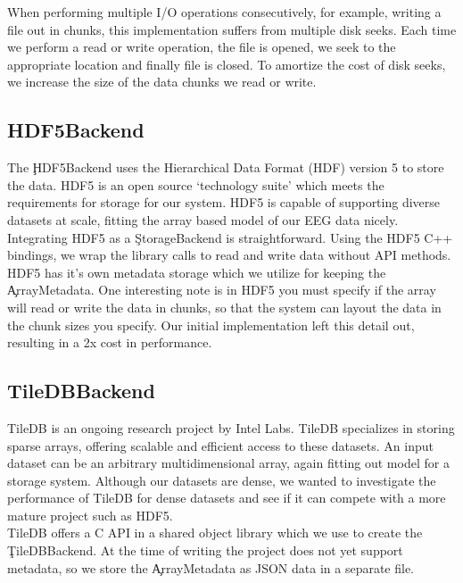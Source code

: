 When performing multiple I/O operations consecutively, for example, writing a
file out in chunks, this implementation suffers from multiple disk seeks. Each
time we perform a read or write operation, the file is opened, we seek to the
appropriate location and finally file is closed. To amortize the cost of disk
seeks, we increase the size of the data chunks we read or write.

\subsection{HDF5Backend}\label{storage-ch:implementation-hdf5}

The \c{HDF5Backend} uses the Hierarchical Data Format (HDF) version 5
\cite{hdf5} to store the data. HDF5 is an open source `technology suite' which
meets the requirements for storage for our system. HDF5 is capable of
supporting diverse datasets at scale, fitting the array based model of our
EEG data nicely. \\

Integrating HDF5 as a \c{StorageBackend} is straightforward. Using the HDF5 C++
bindings, we wrap the library calls to read and write data without API methods.
HDF5 has it's own metadata storage which we utilize for keeping the
\c{ArrayMetadata}. One interesting note is in HDF5 you must specify if the
array will read or write the data in chunks, so that the system can layout the
data in the chunk sizes you specify. Our initial implementation left this
detail out, resulting in a 2x cost in performance.

\subsection{TileDBBackend}\label{storage-ch:implementation-tiledb}

TileDB \cite{tiledb} is an ongoing research project by Intel Labs. TileDB
specializes in storing sparse arrays, offering scalable and efficient access to
these datasets. An input dataset can be an arbitrary multidimensional array,
again fitting out model for a storage system. Although our datasets are dense,
we wanted to investigate the performance of TileDB for dense datasets and see
if it can compete with a more mature project such as HDF5.\\

TileDB offers a C API in a shared object library which we use to create the
\c{TileDBBackend}. At the time of writing the project does not yet support
metadata, so we store the \c{ArrayMetadata} as JSON data in a separate file. \\

